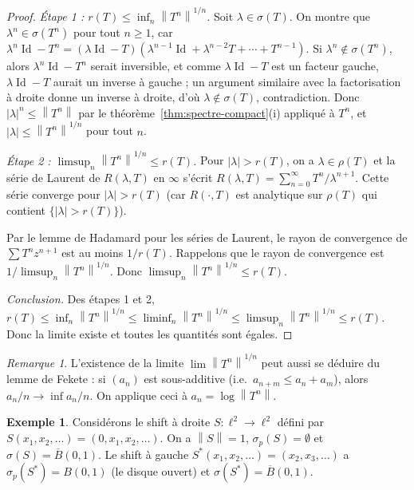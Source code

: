 \documentclass[a4paper,12pt]{book}
\DeclareMathOperator{\Id}{Id}
\newcommand{\norm}[1]{\left\| #1 \right\|}
\newcommand{\abs}[1]{\left| #1 \right|}
\theoremstyle{definition}
\newtheorem{exemple}[definition]{Exemple}
\theoremstyle{plain}
\theoremstyle{remark}
\newtheorem{remarque}[definition]{Remarque}
\begin{document}
\begin{proof}
\emph{Étape 1 : $r(T) \leq \inf_n \norm{T^n}^{1/n}$.}
Soit $\lambda \in \sigma(T)$. On montre que $\lambda^n \in \sigma(T^n)$ pour tout
$n \geq 1$, car
$\lambda^n\Id - T^n = (\lambda\Id - T)(\lambda^{n-1}\Id + \lambda^{n-2}T + \cdots + T^{n-1})$.
Si $\lambda^n \notin \sigma(T^n)$, alors $\lambda^n\Id - T^n$ serait inversible, et
comme $\lambda\Id - T$ est un facteur gauche, $\lambda\Id - T$ aurait un inverse à
gauche ; un argument similaire avec la factorisation à droite donne un inverse à droite,
d'où $\lambda \notin \sigma(T)$, contradiction.
Donc $\abs{\lambda}^n \leq \norm{T^n}$ par le théorème~\ref{thm:spectre-compact}(i)
appliqué à $T^n$, et $\abs{\lambda} \leq \norm{T^n}^{1/n}$ pour tout $n$.

\emph{Étape 2 : $\limsup_n \norm{T^n}^{1/n} \leq r(T)$.}
Pour $\abs{\lambda} > r(T)$, on a $\lambda \in \rho(T)$ et la série de Laurent de
$R(\lambda, T)$ en $\infty$ s'écrit $R(\lambda,T) = \sum_{n=0}^{\infty} T^n / \lambda^{n+1}$.
Cette série converge pour $\abs{\lambda} > r(T)$ (car $R(\cdot,T)$ est analytique sur
$\rho(T)$ qui contient $\{\abs{\lambda} > r(T)\}$).

Par le lemme de Hadamard pour les séries de Laurent, le
rayon de convergence de $\sum T^n z^{n+1}$ est au moins $1/r(T)$.
Rappelons que le rayon de convergence est $1/\limsup_n \norm{T^n}^{1/n}$.
Donc $\limsup_n \norm{T^n}^{1/n} \leq r(T)$.

\emph{Conclusion.}
Des étapes 1 et 2, $r(T) \leq \inf_n \norm{T^n}^{1/n}
\leq \liminf_n \norm{T^n}^{1/n} \leq \limsup_n \norm{T^n}^{1/n} \leq r(T)$.
Donc la limite existe et toutes les quantités sont égales.
\end{proof}

\begin{remarque}\label{rem:rayon-spectral-sous-multiplicatif}
L'existence de la limite $\lim \norm{T^n}^{1/n}$ peut aussi se déduire du lemme de
Fekete : si $(a_n)$ est sous-additive (i.e.\ $a_{n+m} \leq
a_n + a_m$), alors $a_n/n \to \inf a_n/n$. On applique ceci à $a_n = \log\norm{T^n}$.
\end{remarque}

\begin{exemple}\label{ex:spectre-shift}
Considérons le shift à droite $S : \ell^2 \to \ell^2$ défini par
$S(x_1, x_2, \ldots) = (0, x_1, x_2, \ldots)$. On a $\norm{S} = 1$,
$\sigma_p(S) = \emptyset$ et $\sigma(S) = \overline{B}(0,1)$.
Le shift à gauche
$S^*(x_1, x_2, \ldots) = (x_2, x_3, \ldots)$ a $\sigma_p(S^*) = B(0,1)$ (le disque
ouvert) et $\sigma(S^*) = \overline{B}(0,1)$.
\end{exemple}
\end{document}
